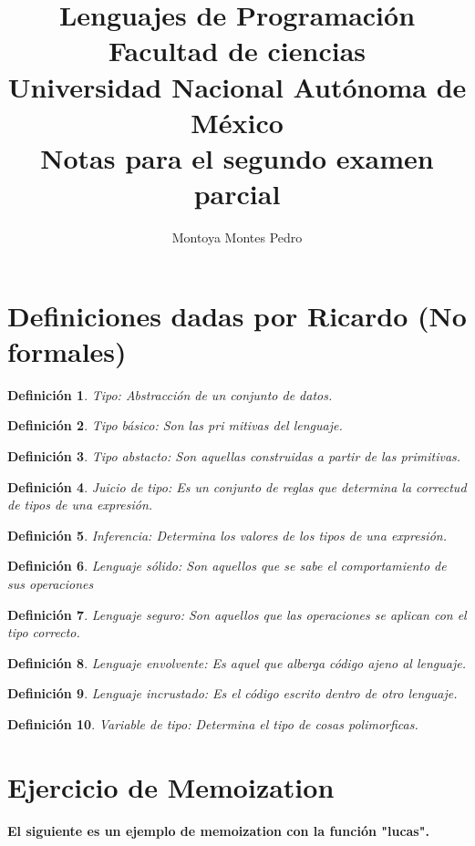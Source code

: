 \documentclass[letterpaper, 12pt]{article}
\title{Lenguajes de Programación\\Facultad de ciencias\\ Universidad Nacional Autónoma de México\\ Notas para el segundo examen parcial}
\author{Montoya Montes Pedro}
\newtheorem{definicion}{Definición}
\begin{document}
\maketitle

\tableofcontents
\newpage

\section{Definiciones dadas por Ricardo (No formales)}
	\begin{definicion}
		Tipo: Abstracción de un conjunto de datos.
	\end{definicion}
	\begin{definicion}
		Tipo básico: Son las pri	mitivas del lenguaje.
	\end{definicion}	
	\begin{definicion}
		Tipo abstacto: Son aquellas construidas a partir de las primitivas.
	\end{definicion}
	\begin{definicion}
		Juicio de tipo: Es un conjunto de reglas que determina la correctud de tipos de una expresión.
	\end{definicion}	
	\begin{definicion}
		Inferencia: Determina  los valores de los tipos de una expresión.
	\end{definicion}
	\begin{definicion}
		Lenguaje sólido: Son aquellos que se sabe el comportamiento de sus operaciones
	\end{definicion}
	\begin{definicion}
		Lenguaje seguro: Son aquellos que las operaciones se aplican con el tipo correcto.
	\end{definicion}	
	\begin{definicion}
		Lenguaje envolvente: Es aquel que alberga código ajeno al lenguaje.
	\end{definicion}
	\begin{definicion}
		Lenguaje incrustado: Es el código escrito dentro de otro lenguaje.
	\end{definicion}
	\begin{definicion}
		Variable de tipo: Determina el tipo de cosas polimorficas.
	\end{definicion}
\newpage
\section{Ejercicio de Memoization}
\textbf{El siguiente es un ejemplo de memoization con la función "lucas".}
\end{document}
